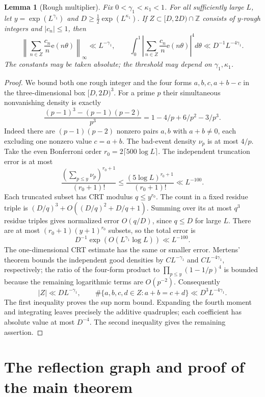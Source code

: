 \documentclass[11pt]{article}
\newtheorem{lemma}[theorem]{Lemma}
\theoremstyle{definition}
\newcommand{\e}{\mathrm e}
\newcommand{\Z}{\mathbb Z}
\newcommand{\norm}[1]{\left\lVert#1\right\rVert}
\newcommand{\abs}[1]{\left\lvert#1\right\rvert}
\begin{document}
\begin{lemma}[Rough multiplier]\label{lem:rough}
Fix $0<\gamma_1<\kappa_1<1$.
For all sufficiently large $L$, let $y=\exp(L^{\gamma_1})$ and
$D\ge\frac12\exp(L^{\kappa_1})$.
If $Z\subset[D,2D)\cap\Z$ consists of $y$-rough integers and
$|c_n|\le1$, then
\begin{equation}\label{eq:rough}
 \norm{\sum_{n\in Z}\frac{c_n}{n}\e(n\theta)}_\infty\ll L^{-\gamma_1},
 \qquad
 \int_0^1\abs{\sum_{n\in Z}\frac{c_n}{n}\e(n\theta)}^4d\theta
             \ll D^{-1}L^{-4\gamma_1}.
\end{equation}
The constants may be taken absolute; the threshold may depend on
$\gamma_1,\kappa_1$.
\end{lemma}
\begin{proof}
We bound both one rough integer and the four forms $a,b,c,a+b-c$ in
the three-dimensional box $[D,2D)^3$.
For a prime $p$ their simultaneous nonvanishing density is exactly
\[
 \frac{(p-1)^3-(p-1)(p-2)}{p^3}
 =1-4/p+6/p^2-3/p^3.
\]
Indeed there are $(p-1)(p-2)$ nonzero pairs $a,b$ with $a+b\ne0$,
each excluding one nonzero value $c=a+b$.
The bad-event density $\nu_p$ is at most $4/p$.
Take the even Bonferroni order $r_0=2\lceil500\log L\rceil$.
The independent truncation error is at most
\[
 \frac{(\sum_{p\le y}\nu_p)^{r_0+1}}{(r_0+1)!}
 \le\frac{(5\log L)^{r_0+1}}{(r_0+1)!}\ll L^{-100}.
\]
Each truncated subset has CRT modulus $q\le y^{r_0}$.
The count in a fixed residue triple is
$(D/q)^3+O((D/q)^2+D/q+1)$.
Summing over its at most $q^3$ residue triples gives normalized error
$O(q/D)$, since $q\le D$ for large $L$.
There are at most $(r_0+1)(y+1)^{r_0}$ subsets, so the total error is
\[
 D^{-1}\exp(O(L^{\gamma_1}\log L))\ll L^{-100}.
\]
The one-dimensional CRT estimate has the same or smaller error.
Mertens' theorem bounds the independent good densities by
$C L^{-\gamma_1}$ and $C L^{-4\gamma_1}$, respectively; the ratio
of the four-form product to $\prod_{p\le y}(1-1/p)^4$ is bounded
because the remaining logarithmic terms are $O(p^{-2})$.
Consequently
\[
 |Z|\ll D L^{-\gamma_1},\qquad
 \#\{a,b,c,d\in Z:a+b=c+d\}\ll D^3L^{-4\gamma_1}.
\]
The first inequality proves the sup norm bound.
Expanding the fourth moment and integrating leaves precisely the
additive quadruples; each coefficient has absolute value at most
$D^{-4}$. The second inequality gives the remaining assertion.
\end{proof}

\section{The reflection graph and proof of the main theorem}
\end{document}
